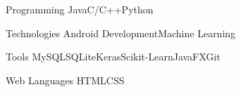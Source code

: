 \begin{cvskills}
\cvskill
{Programming}
{Java{\enskip\cdotp\enskip}C/C++{\enskip\cdotp\enskip}Python}



\cvskill
{Technologies}
{Android Development{\enskip\cdotp\enskip}Machine Learning}

\cvskill
{Tools}
{MySQL{\enskip\cdotp\enskip}SQLite{\enskip\cdotp\enskip}Keras{\enskip\cdotp\enskip}Scikit-Learn{\enskip\cdotp\enskip}JavaFX{\enskip\cdotp\enskip}Git}

\cvskill
{Web Languages}
{HTML{\enskip\cdotp\enskip}CSS}






\end{cvskills}

